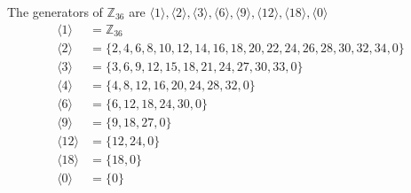 \documentclass[paper=usletter, fontsize=12pt]{article}
\begin{document}
\begin{itemize}
\begin{itemize}
\begin{enumerate}
\begin{cproof}
                    The generators of $\mathbb{Z}_{36}$ are $\langle1\rangle,
                    \langle2\rangle, \langle3\rangle, \langle6\rangle,
                    \langle9\rangle, \langle12\rangle, \langle18\rangle,
                    \langle0\rangle$
                    \begin{align*}
                        \langle1\rangle & = \mathbb{Z}_{36}\\
                        \langle2\rangle & = \{2,4,6,8,10,12,14,16,18,20,22,24,26,28,30,32,34,0\}\\
                        \langle3\rangle & = \{3,6,9,12,15,18,21,24,27,30,33,0\}\\
                        \langle4\rangle & = \{4,8,12,16,20,24,28,32,0\}\\
                        \langle6\rangle & = \{6,12,18,24,30,0\}\\
                        \langle9\rangle & = \{9,18,27,0\}\\
                        \langle12\rangle & = \{12,24,0\}\\
                        \langle18\rangle & = \{18,0\}\\
                        \langle0\rangle & = \{0\}
                    \end{align*}


\end{cproof}
\end{enumerate}
\end{itemize}
\end{itemize}
\end{document}
